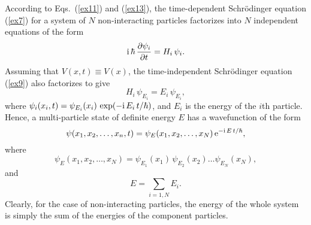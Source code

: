  According to Eqs.~(\ref{ex11}) and (\ref{ex13}), the time-dependent
 Schr\"{o}dinger equation (\ref{ex7}) for a system of $N$ non-interacting
 particles factorizes into $N$ independent equations of the form
 \begin{equation}
 {\rm i}\,\hbar\,\frac{\partial \psi_i}{\partial t} = H_i\,\psi_i.
 \end{equation}
 Assuming that $V(x,t)\equiv V(x)$,  the time-independent Schr\"{o}dinger equation (\ref{ex9}) 
 also factorizes to give
 \begin{equation}
 H_i\,\psi_{E_i} =E_i\,\psi_{E_i},
 \end{equation}
 where 
  $\psi_i(x_i,t) = \psi_{E_i}(x_i)\,\exp(-{\rm i}\, E_i\,t/\hbar)$,
  and $E_i$ is the energy of the $i$th particle.
 Hence, a multi-particle state of definite energy $E$ has a
 wavefunction of the form
 \begin{equation}
 \psi(x_1,x_2,\ldots, x_n, t) =\psi_E(x_1,x_2,\ldots, x_N)\,{\rm
 e}^{-{\rm i}\,E\,t/\hbar},
 \end{equation}
 where
 \begin{equation}
\psi_E(x_1,x_2,\ldots, x_N) =  \psi_{E_1}(x_1)\,\psi_{E_2}(x_2)\ldots\psi_{E_N}(x_N),
 \end{equation}
 and
 \begin{equation}
 E = \sum_{i=1,N} E_i.
 \end{equation}
 Clearly, for the
 case of non-interacting particles, the energy of
 the whole system is simply the sum of the energies of the component
 particles.
 
